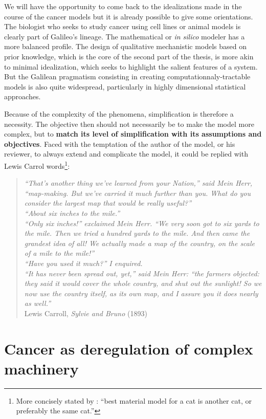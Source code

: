 \documentclass[a4paper,12pt,twoside,onecolumn,openright,final,oldfontcommands]{memoir}
\begin{document}
We will have the opportunity to come back to the idealizations made in
the course of the cancer models but it is already possible to give some
orientations. The biologist who seeks to study cancer using cell lines
or animal models is clearly part of Galileo's lineage. The mathematical
or \emph{in silico} modeler has a more balanced profile. The design of
qualitative mechanistic models based on prior knowledge, which is the
core of the second part of the thesis, is more akin to minimal
idealization, which seeks to highlight the salient features of a system.
But the Galilean pragmatism consisting in creating
computationnaly-tractable models is also quite widespread, particularly
in highly dimensional statistical approaches.

Because of the complexity of the phenomena, simplification is therefore
a necessity. The objective then should not necessarily be to make the
model more complex, but to \textbf{match its level of simplification
with its assumptions and objectives}. Faced with the temptation of the
author of the model, or his reviewer, to always extend and complicate
the model, it could be replied with Lewis Carrol words\footnote{More
  concisely stated by \citet{rosenblueth1945role}: ``best material model
  for a cat is another cat, or preferably the same cat.''}:

\begin{quote}
\emph{``That's another thing we've learned from your Nation,'' said Mein
Herr, ``map-making. But we've carried it much further than you. What do
you consider the largest map that would be really useful?''}\\
\emph{``About six inches to the mile.''}\\
\emph{``Only six inches!'' exclaimed Mein Herr. ``We very soon got to
six yards to the mile. Then we tried a hundred yards to the mile. And
then came the grandest idea of all! We actually made a map of the
country, on the scale of a mile to the mile!''}\\
\emph{``Have you used it much?'' I enquired.}\\
\emph{``It has never been spread out, yet,'' said Mein Herr: ``the
farmers objected: they said it would cover the whole country, and shut
out the sunlight! So we now use the country itself, as its own map, and
I assure you it does nearly as well.''}\\
Lewis Carroll, \emph{Sylvie and Bruno} (1893)
\end{quote}

\chapter{Cancer as deregulation of complex
machinery}\label{cancer-as-deregulation-of-complex-machinery}
\end{document}
